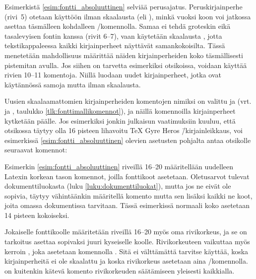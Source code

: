 Esimerkistä \ref{esim:fontti_absoluuttinen} selviää perus\-ajatus.
Peruskirjainperhe (rivi~5) otetaan käyttöön ilman skaalausta (eli
), minkä vuoksi koon voi jatkossa asettaa täsmälleen
kohdalleen \-/komennolla. Samaa ei tehdä groteskin
eikä tasalevyisen fontin kanssa (rivit 6--7), vaan käytetään skaalausta
, jotta tekstikappaleessa kaikki kirjainperheet
näyttävät samankokoisilta. Tässä menetetään mahdollisuus määrittää
näiden kirjainperheiden koko täsmällisesti pistemitan avulla. Jos siihen
on tarvetta esimerkiksi otsikoissa, voidaan käyttää rivien 10--11
komentoja. Niillä luodaan uudet kirjainperheet, jotka ovat käytännössä
samoja mutta ilman skaalausta.

Uusien skaalaamattomien kirjainperheiden komentojen nimiksi on valittu
 ja 
(vrt.  ja , taulukko
\ref{tlk:fonttimallikomennot}), ja näillä komennoilla kirjainperheet
kytketään päälle. Jos esimerkiksi jonkin julkaisun vaatimuksiin kuuluu,
että otsikossa täytyy olla 16 pisteen lihavoitu TeX Gyre Heros
\=/kirjainleikkaus, voi esimerkissä \ref{esim:fontti_absoluuttinen}
olevien asetusten pohjalta antaa otsikolle seuraavat komennot:

\begin{koodilohkosis}
  \sffamilyabs\fontsize{16bp}{18bp}\bfseries
\end{koodilohkosis}

Esimerkin \ref{esim:fontti_absoluuttinen} riveillä 16--20 määritellään
uudelleen Latexin korkean tason komennot, joilla fonttikoot asetetaan.
Oletus\-arvot tulevat dokumenttiluokasta (luku
\ref{luku:dokumenttiluokat}), mutta jos ne eivät ole sopivia, täytyy
vähintäänkin määritellä komento  mutta sen
lisäksi kaikki ne koot, joita omassa dokumentissa tarvitaan. Tässä
esimerkissä normaali koko asetetaan 14 pisteen kokoiseksi.

Jokaiselle fonttikoolle määritetään riveillä 16--20 myös oma
rivikorkeus, ja se on tarkoitus asettaa sopivaksi juuri kyseiselle
koolle. Rivikorkeuteen vaikuttaa myös kerroin , joka asetetaan komennolla .
Sitä ei välttämättä tarvitse käyttää, koska kirjainperheitä ei ole
skaalattu ja koska rivikorkeus asetetaan aina \-/komennolla.  on kuitenkin kätevä
komento rivikorkeuden säätämiseen yleisesti kaikkialla.

